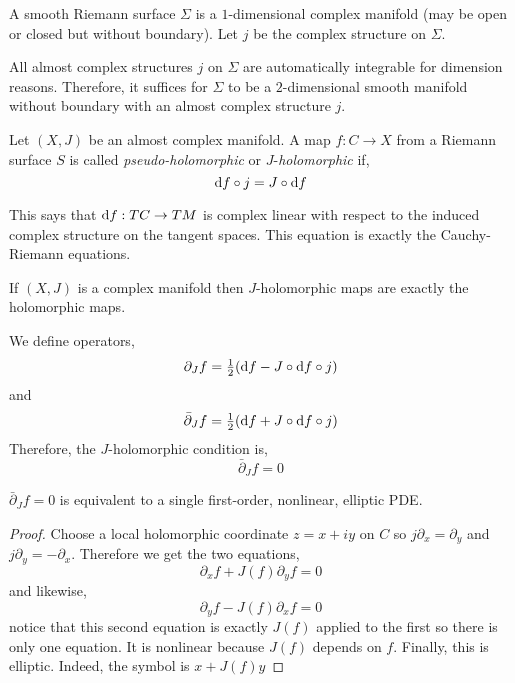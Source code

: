 \documentclass[12pt]{article}
\newcommand{\dbar}{\bar{\partial}}
\begin{document}
\begin{defn}
A smooth Riemann surface $\Sigma$ is a $1$-dimensional complex manifold (may be open or closed but without boundary). Let $j$ be the complex structure on $\Sigma$. 
\end{defn}

\begin{rmk}
All almost complex structures $j$ on $\Sigma$ are automatically integrable for dimension reasons. Therefore, it suffices for $\Sigma$ to be a $2$-dimensional smooth manifold without boundary with an almost complex structure $j$. 
\end{rmk}

\begin{defn}
Let $(X, J)$ be an almost complex manifold. A map $f : C \to X$ from a Riemann surface $S$ is called \textit{pseudo-holomorphic} or $J$-\textit{holomorphic} if,
\[ \mathrm{d}{f} \circ j = J \circ \mathrm{d}{f} \]
\end{defn}

\begin{rmk}
This says that $\mathrm{d}{f} : TC \to TM$ is complex linear with respect to the induced complex structure on the tangent spaces. This equation is exactly the Cauchy-Riemann equations. 
\end{rmk}

\begin{rmk}
If $(X, J)$ is a complex manifold then $J$-holomorphic maps are exactly the holomorphic maps.
\end{rmk}

\begin{defn}
We define operators,
\[ \partial_J f = \tfrac{1}{2} (\mathrm{d}{f}  - J \circ \mathrm{d}{f} \circ j) \]
and
\[ \dbar_J f = \tfrac{1}{2} (\d{f} + J \circ \d{f} \circ j) \]
Therefore, the $J$-holomorphic condition is,
\[ \dbar_J f = 0 \]
\end{defn}

\begin{prop}
$\dbar_J f = 0$ is equivalent to a single first-order, nonlinear, elliptic PDE. 
\end{prop}

\begin{proof}
Choose a local holomorphic coordinate $z = x + i y$ on $C$ so $j \partial_x = \partial_y$ and $j \partial_y = - \partial_x$. Therefore we get the two equations,
\[ \partial_x f + J(f) \partial_y f = 0 \]
and likewise,
\[ \partial_y f  - J(f) \partial_x f = 0 \]
notice that this second equation is exactly $J(f)$ applied to the first so there is only one equation. It is nonlinear because $J(f)$ depends on $f$. Finally, this is elliptic. Indeed, the symbol is $x + J(f) y$ 
\end{proof}
\end{document}
